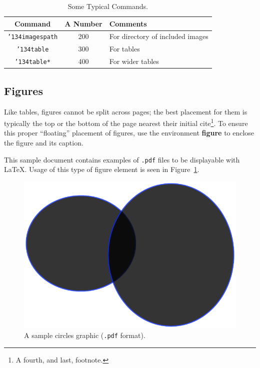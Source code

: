 \documentclass[article,english]{stucosrec}
\newcommand{\latex}{\LaTeX\xspace}
\begin{document}
	\begin{table}
		\centering
		\caption{Some Typical Commands.}
		\label{tab:table2}
		\begin{tabular}{|c|c|l|} \hline
			Command&A Number&Comments\\ \hline
			\texttt{{\char'134}imagespath} & 200 & For directory of included images \\ \hline
			\texttt{{\char'134}table} & 300 & For tables\\ \hline
			\texttt{{\char'134}table*} & 400& For wider tables\\ \hline
		\end{tabular}
	\end{table}
	
	\subsection{Figures}
	
	Like tables, figures cannot be split across pages; the best placement for them is typically the top or the bottom of the page nearest their initial cite\footnote{A fourth, and last, footnote.}.
	To ensure this proper ``floating'' placement of figures, use the environment \textbf{figure} to enclose the figure and its caption.
	
	This sample document contains examples of \texttt{.pdf} files to be displayable with \latex.
	Usage of this type of figure element is seen in Figure~\ref{fig:circles}.
	
	\begin{figure}
		\centering
		\includegraphics[scale=0.5]{circles.pdf}
		\caption{A sample circles graphic (\texttt{.pdf} format).}
		\label{fig:circles}
	\end{figure}
\end{document}
